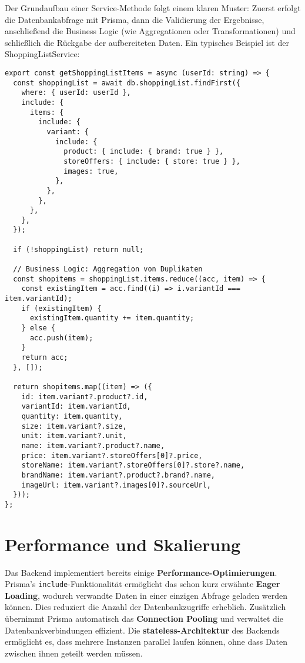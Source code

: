Der Grundaufbau einer Service-Methode folgt einem klaren Muster: Zuerst erfolgt die Datenbankabfrage mit Prisma, dann die Validierung der Ergebnisse, anschließend die Business Logic (wie Aggregationen oder Transformationen) und schließlich die Rückgabe der aufbereiteten Daten. Ein typisches Beispiel ist der ShoppingListService:

\begin{lstlisting}[style=typescriptstyle,caption={Service-Layer Beispiel}]
export const getShoppingListItems = async (userId: string) => {
  const shoppingList = await db.shoppingList.findFirst({
    where: { userId: userId },
    include: {
      items: {
        include: {
          variant: {
            include: {
              product: { include: { brand: true } },
              storeOffers: { include: { store: true } },
              images: true,
            },
          },
        },
      },
    },
  });

  if (!shoppingList) return null;

  // Business Logic: Aggregation von Duplikaten
  const shopitems = shoppingList.items.reduce((acc, item) => {
    const existingItem = acc.find((i) => i.variantId === item.variantId);
    if (existingItem) {
      existingItem.quantity += item.quantity;
    } else {
      acc.push(item);
    }
    return acc;
  }, []);

  return shopitems.map((item) => ({
    id: item.variant?.product?.id,
    variantId: item.variantId,
    quantity: item.quantity,
    size: item.variant?.size,
    unit: item.variant?.unit,
    name: item.variant?.product?.name,
    price: item.variant?.storeOffers[0]?.price,
    storeName: item.variant?.storeOffers[0]?.store?.name,
    brandName: item.variant?.product?.brand?.name,
    imageUrl: item.variant?.images[0]?.sourceUrl,
  }));
};
\end{lstlisting}

\section{Performance und Skalierung}

Das Backend implementiert bereits einige \textbf{Performance-Optimierungen}. Prisma's \texttt{include}-Funktionalität ermöglicht das schon kurz erwähnte \textbf{Eager Loading}, wodurch verwandte Daten in einer einzigen Abfrage geladen werden können. Dies reduziert die Anzahl der Datenbankzugriffe erheblich. Zusätzlich übernimmt Prisma automatisch das \textbf{Connection Pooling} und verwaltet die Datenbankverbindungen effizient. Die \textbf{stateless-Architektur} des Backends ermöglicht es, dass mehrere Instanzen parallel laufen können, ohne dass Daten zwischen ihnen geteilt werden müssen.

